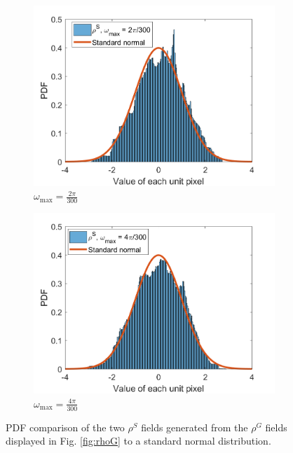 \documentclass[12pt,dvipsnames]{report}
\begin{document}
\begin{figure}[!ht]
\centering
\begin{subfigure}{.45\textwidth}
	\centering
	\includegraphics[width=1\linewidth]{rhoS_pdf_O2pi-300_L50_X1000_Y1000}
	\caption{\small $\omega_{\max}=\frac{2\pi}{300}$}
	\label{fig:rhoS_pdf_2pi-300}
\end{subfigure}
\hspace{0.5cm}
\begin{subfigure}{.45\textwidth}
	\centering
	\includegraphics[width=1\linewidth]{rhoS_pdf_O4pi-300_L50_X1000_Y1000}
	\caption{\small $\omega_{\max}=\frac{4\pi}{300}$}
	\label{fig:rhoS_pdf_4pi-300}
\end{subfigure}
\caption[PDF comparisons of example standard normal fields to the standard normal distribution]{\small PDF comparison of the two $\rho^S$ fields generated from the $\rho^G$ fields displayed in Fig. \ref{fig:rhoG} to a standard normal distribution.}
\label{fig:rhoS_pdf}
\end{figure}
\end{document}
